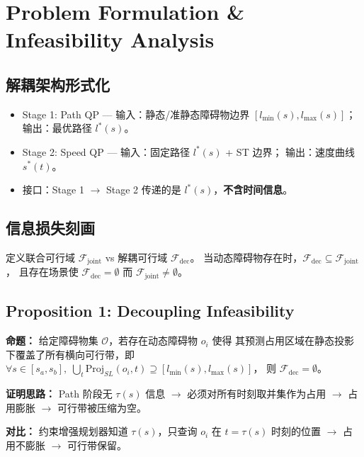 \documentclass[a4paper,12pt]{article}
\begin{document}
\section{Problem Formulation \& Infeasibility Analysis}

\subsection{解耦架构形式化}

\begin{itemize}
  \item Stage 1: Path QP — 输入：静态/准静态障碍物边界 $[l_{\min}(s), l_{\max}(s)]$；
        输出：最优路径 $l^*(s)$。
  \item Stage 2: Speed QP — 输入：固定路径 $l^*(s)$ + ST 边界；
        输出：速度曲线 $s^*(t)$。
  \item 接口：Stage 1 $\to$ Stage 2 传递的是 $l^*(s)$，\textbf{不含时间信息}。
\end{itemize}

\subsection{信息损失刻画}

定义联合可行域 $\mathcal{F}_{\text{joint}}$ vs 解耦可行域 $\mathcal{F}_{\text{dec}}$。
当动态障碍物存在时，$\mathcal{F}_{\text{dec}} \subseteq \mathcal{F}_{\text{joint}}$，
且存在场景使 $\mathcal{F}_{\text{dec}} = \emptyset$ 而 $\mathcal{F}_{\text{joint}} \neq \emptyset$。

\subsection{Proposition 1: Decoupling Infeasibility}

\textbf{命题：} 给定障碍物集 $\mathcal{O}$，若存在动态障碍物 $o_i$ 使得
其预测占用区域在静态投影下覆盖了所有横向可行带，即
$\forall s \in [s_a, s_b],\; \bigcup_{t} \text{Proj}_{SL}(o_i, t) \supseteq [l_{\min}(s), l_{\max}(s)]$，
则 $\mathcal{F}_{\text{dec}} = \emptyset$。

\textbf{证明思路：} Path 阶段无 $\tau(s)$ 信息 $\to$ 必须对所有时刻取并集作为占用
$\to$ 占用膨胀 $\to$ 可行带被压缩为空。

\textbf{对比：} 约束增强规划器知道 $\tau(s)$，只查询 $o_i$ 在 $t=\tau(s)$ 时刻的位置
$\to$ 占用不膨胀 $\to$ 可行带保留。
\end{document}
